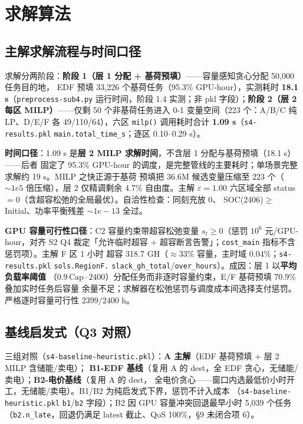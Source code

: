 \documentclass{internal-report}
\begin{document}
\section{求解算法}
\label{sec:solve}

\subsection{主解求解流程与时间口径}
\label{sec:pipeline}

求解分两阶段：\textbf{阶段 1（层 1 分配 + 基荷预填）}——容量感知贪心分配 50{,}000 任务目的地，
EDF 预填 33{,}226 个基荷任务（95.3\% GPU-hour），实测耗时 \textbf{18.1 s}（\texttt{preprocess-sub4.py}
运行时间，阶段 1.4 实测；非 pkl 字段）；\textbf{阶段 2（层 2 每区 MILP）}——仅剩 50 个非基荷任务进入
0-1 变量空间（223 个：A/B/C 纯 LP、D/E/F 各 49/110/64），六区 \texttt{milp()} 调用耗时合计
\textbf{1.09 s}（\texttt{s4-results.pkl} \texttt{main.total\_time\_s}；逐区 0.10--0.29 s）。

\textbf{时间口径}：1.09 s 是\textbf{层 2 MILP 求解时间}，不含层 1 分配与基荷预填（18.1 s）——后者
固定了 95.3\% GPU-hour 的调度，是完整管线的主要耗时；单场景完整求解约 19 s。MILP 之快正源于基荷
预填把 36.6M 候选变量压缩至 223 个（$\sim 1e5$ 倍压缩），层 2 仅精调剩余 4.7\% 自由度。主解
$\varepsilon{=}1.00$ 六区域全部 status$=0$（含超容松弛的全局最优）。自洽性检查：同刻充放 0、
SOC(2406)$\ge$Initial、功率平衡残差 $\sim 1e{-}13$ 全过。

\textbf{GPU 容量可行性口径}：C2 容量约束带超容松弛变量 $s_t\ge 0$（惩罚 $10^6$ 元/GPU-hour，对齐
S2 Q4 裁定「允许临时超容 + 超容断言告警」；\texttt{cost\_main} 指标不含惩罚项）。主解 F 区 1 小时
超容 318.7 GH（$\approx 33\%$ 容量，主时域 $0.04\%$；\texttt{s4-results.pkl} \texttt{sols.RegionF.}
\texttt{slack\_gh\_total}/\texttt{over\_hours}）。成因：层 1 以\textbf{平均负载率阈值}
（$0.9\,\text{Cap}\cdot 2400$）分配任务而非逐时容量约束，E/F 基荷预填 70.9\% 叠加实时任务后容量
余量不足；求解器在松弛惩罚与调度成本间选择支付惩罚。严格逐时容量可行性 $2399/2400$ h。

\subsection{基线启发式（Q3 对照）}
\label{sec:baseline-method}

三组对照（\texttt{s4-baseline-heuristic.pkl}）：\textbf{A 主解}（EDF 基荷预填 + 层 2 MILP 含储能/卖电）；
\textbf{B1-EDF 基线}（复用 A 的 dest，全 EDF 贪心，无储能/卖电）；\textbf{B2-电价基线}（复用 A 的 dest，
全电价贪心——窗口内选最低价小时开工，无储能/卖电）。B1/B2 为纯启发式下界，惩罚不计入成本
（\texttt{s4-baseline-heuristic.pkl} \texttt{b1}/\texttt{b2} 字段）；B2 因 GPU 容量冲突回退最早小时
5{,}039 个任务（\texttt{b2.n\_late}，回退仍满足 latest 截止、QoS 100\%，§9 未闭合项 6）。
\end{document}
